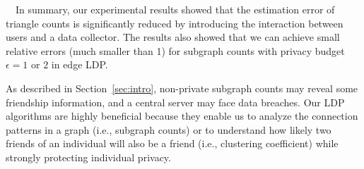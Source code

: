 \smallskip
{}~~In summary, 
our experimental results showed that the estimation error of triangle counts is significantly reduced by introducing the interaction between users and a data collector. 
The results also showed that 
we can achieve small relative errors 
(much smaller than 1) for subgraph counts 
with privacy budget $\epsilon=1$ or $2$ in edge LDP. 

As described in Section~\ref{sec:intro}, non-private 
subgraph 
counts may reveal some friendship information, and a central server may face data breaches. 
Our LDP algorithms are highly beneficial because they enable us to analyze the connection patterns in a graph 
(i.e., subgraph counts) 
or to understand how likely two friends of an individual will also be a friend 
(i.e., clustering coefficient) 
while strongly protecting individual privacy.
